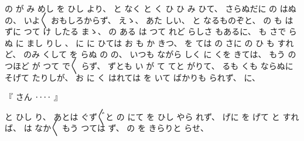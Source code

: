 %
の
が
み
めし
を%
ひし
より、
%
と
なく
と
く
ひ
ひ
み
ひて、
%
さらぬだに
の
はぬ
の、
いよ〳〵
おもしろからず、
えゝ、
%
あた
しい、
%
と
なるものぞと、
%
の
も
はずに
つて
け
したる
まゝ、
%
の
ある
は
つて
れど
らしさ
もあるに、
%
も
さで
らぬ
に
まし
りし
、
%
に
に
ひては
お
も
か
きつ、
%
を
ては
の
さに
の
ひ
も
すれど、
%
のみ
くして
を
らぬ
の
の、
%
いつも
ながら
しく
に
くを
きては、
%
もう
の
つほど
が
つて
で〳〵
らず、
%
ずとも
い
が
て
てと
がりて、
%
るも
くも
ならぬに
そげて
たりしが、
%
お
に
く
はれては
を
いて
ばかりも
られず、
%
に、

%
『
さん
‥‥
』

%
と
ひし
り、
%
あとは
ぐず〴〵と
の
にて
を
ひし
やら
れず、
%
げに
を
げて
と
すれば、
%
は
なか〳〵
もう
つては
ず、
%
の
を
きらりと
らせ、

